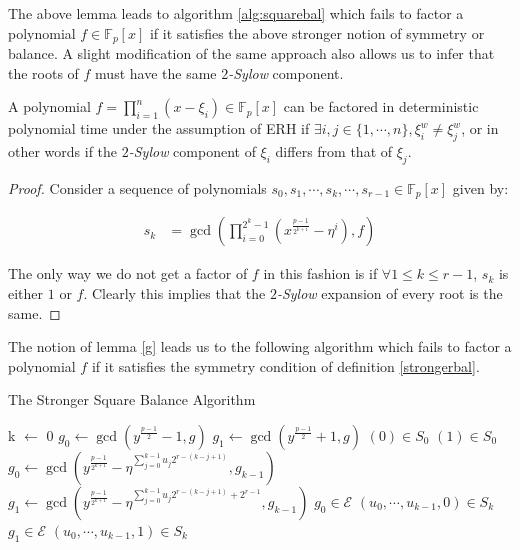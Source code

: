 The above lemma leads to algorithm \ref{alg:squarebal} which fails to factor a polynomial $f \in \mathbb{F}_p[x]$ if it satisfies the above stronger notion of symmetry or balance.
A slight modification of the same approach also allows us to infer that the roots of $f$ must have the same \emph{$2$-Sylow} component.

\begin{lemma}
	A polynomial $f = \prod_{i=1}^n (x-\xi_i) \in \mathbb{F}_p[x]$ can be factored in deterministic polynomial time under the assumption of ERH if $\exists i,j \in \{1,\cdots,n\},\xi_i^w \neq \xi_j^w$, or in other
	words if the \emph{$2$-Sylow} component of $\xi_i$ differs from that of $\xi_j$.
\end{lemma}

\begin{proof}
	Consider a sequence of polynomials $s_0,s_1,\cdots,s_k,\cdots,s_{r-1} \in \mathbb{F}_p[x]$ given by:

	\begin{align*}
		s_k &= \gcd\left(\prod_{i=0}^{2^k-1} \left(x^{\frac{p-1}{2^{k+1}}}-\eta^i
		\right), f \right) 
	\end{align*}

	The only way we do not get a factor of $f$ in this fashion is if $\forall 1 \le k \le r-1$, $s_k$ is either
	$1$ or $f$. Clearly this implies that the \emph{$2$-Sylow} expansion of every root is the same.
\end{proof}

The notion of lemma \ref{g} leads us to the following algorithm which fails to factor a polynomial $f$ if it satisfies the symmetry condition of definition \ref{strongerbal}.


\begin{algorithm}[H]
	\caption{The Stronger Square Balance Algorithm}
	\label{alg:squarebal}
\begin{algorithmic}
         \State  k $\leftarrow$ $0$ 
	 \State  $g_0 \leftarrow \gcd(y^{\frac{p-1}{2}}-1,g)$
	 \State  $g_1 \leftarrow \gcd(y^{\frac{p-1}{2}}+1,g)$
  \State $(0)\in S_0$ \EndIf
  \State $(1)\in S_0$ \EndIf
		  \State $g_0 \leftarrow \gcd(y^{\frac{p-1}{2^{k+1}}}-\eta^{\sum_{j=0}^{k-1}u_{j}2^{r-(k-j+1)}},g_{k-1})$
		  \State $g_1 \leftarrow \gcd(y^{\frac{p-1}{2^{k+1}}}-\eta^{\sum_{j=0}^{k-1}u_{j}2^{r-(k-j+1)}+2^{r-1}},g_{k-1})$
			\State $g_0 \in \mathcal{E}$ 
		      \EndIf
		      \State $(u_0,\cdots,u_{k-1},0) \in S_k$ 
		  \EndIf
		          \State $g_1 \in \mathcal{E}$
		      \EndIf
		      \State $(u_0,\cdots,u_{k-1},1) \in S_k$ 
		  \EndIf
	 \EndFor
\EndFor
\end{algorithmic}
\end{algorithm}

